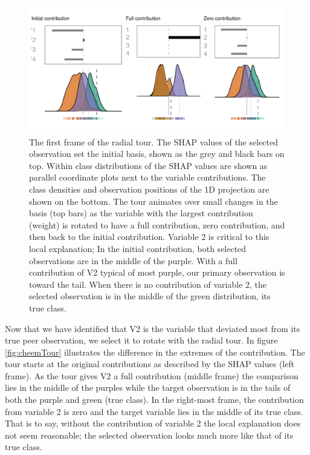 \documentclass{template/monashthesis}
\begin{document}
\begin{figure}

{\centering \includegraphics[width=1\linewidth,]{./figures_from_script/ch5_fig4_cheem_endpts} 

}

\caption{The first frame of the radial tour. The SHAP values of the selected observation set the initial basis, shown as the grey and black bars on top. Within class distributions of the SHAP values are shown as parallel coordinate plots next to the variable contributions. The class densities and observation positions of the 1D projection are shown on the bottom. The tour animates over small changes in the basis (top bars) as the variable with the largest contribution (weight) is rotated to have a full contribution, zero contribution, and then back to the initial contribution. Variable 2 is critical to this local explanation; In the initial contribution, both selected observations are in the middle of the purple. With a full contribution of V2 typical of most purple, our primary observation is toward the tail. When there is no contribution of variable 2, the selected observation is in the middle of the green distribution, its true class.}\label{fig:ch5fig4}
\end{figure}

Now that we have identified that V2 is the variable that deviated most from its true peer observation, we select it to rotate with the radial tour. In figure \ref{fig:cheemTour} illustrates the difference in the extremes of the contribution. The tour starts at the original contributions as described by the SHAP values (left frame). As the tour gives V2 a full contribution (middle frame) the comparison lies in the middle of the purples while the target observation is in the tails of both the purple and green (true class). In the right-most frame, the contribution from variable 2 is zero and the target variable lies in the middle of its true class. That is to say, without the contribution of variable 2 the local explanation does not seem reasonable; the selected observation looks much more like that of its true class.
\end{document}
